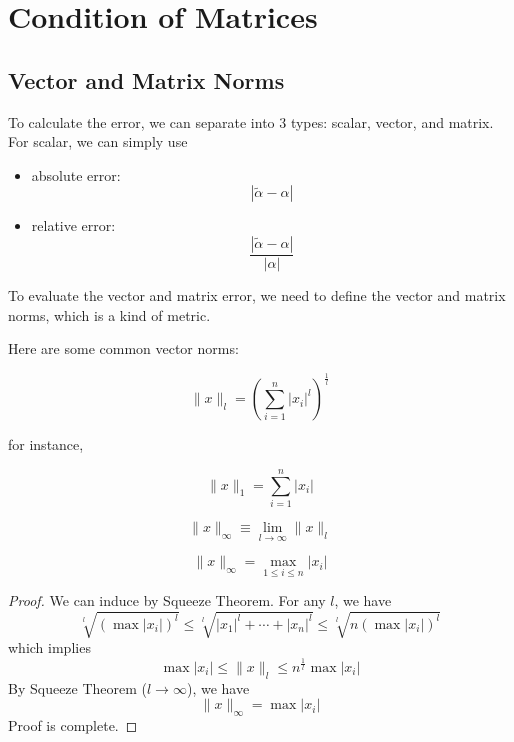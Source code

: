 
\section{Condition of Matrices}

\subsection{Vector and Matrix Norms}

To calculate the error, we can separate into 3 types: scalar, vector, and matrix. For scalar, we can simply use
\begin{itemize}
    \item absolute error: \[
        |\tilde{\alpha} - \alpha|
    \]
    \item relative error: \[
        \frac{|\tilde{\alpha} - \alpha|}{|\alpha|}
    \]
\end{itemize}

To evaluate the vector and matrix error, we need to define the vector and matrix norms, which is a kind of metric. 

\begin{definition*}
    Here are some common vector norms:
    \begin{definition}[$l$-norm]
        \[
            \|x\|_l = \left(\sum_{i=1}^n |x_i|^l\right)^{\frac{1}{l}}
        \]
    \end{definition}
    for instance, 
    \begin{definition}[$1$-norm]
        \[
            \|x\|_1 = \sum_{i=1}^n |x_i|
        \]
    \end{definition}

    \begin{definition}
        \[
            \|x\|_\infty \equiv \lim_{l\to\infty} \|x\|_l
        \]
    \end{definition}
\end{definition*}

\begin{theorem}
    \[
        \|x\|_\infty = \max_{1\leq i \leq n} |x_i|
    \]    
\end{theorem}
\begin{proof}
    We can induce by Squeeze Theorem. For any $l$, we have \[
        \sqrt[l]{(\max |x_i|)^{l}} \leq \sqrt[l]{|x_1|^{l} + \cdots + |x_n|^l} \leq \sqrt[l]{n(\max |x_i|)^{l}}
    \]
    which implies \[
        \max |x_i| \leq \|x\|_l \leq n^{\frac{1}{l}} \max |x_i|
    \]
    By Squeeze Theorem ($l \to \infty$), we have \[
        \|x\|_\infty = \max |x_i|
    \] 
    Proof is complete.
\end{proof}


